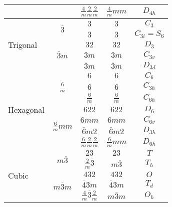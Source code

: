 \documentclass[12pt]{article}
\begin{document}
\begin{table}[h]
\begin{tabular}{lcccc}
                               &                                 & $\displaystyle \frac{4}{m}\frac{2}{m}\frac{2}{m}$ & $\displaystyle \frac{4}{m}mm$ & $D_{4h}$ \\ [1.5ex]
    \hline
    \multirow{5}{*}{Trigonal } & \multirow{2}{*}{$\overline{3}$} & $3$ & $3$ & $C_3$\\
                               &                                 & $\overline{3}$ & $\overline{3}$ & $C_{3i} = S_6$ \\
                               \cline{2-5}
							  & \multirow{3}{*}{$\overline{3}m$} & $32$ & $32$ & $D_3$\\
                               &                                 & $3m$ & $3m$ & $C_{3v}$ \\
                               &                                 & $\overline{3}m$ & $\overline{3}m$ & $D_{3d}$ \\
    \hline
    \multirow{7}{*}{Hexagonal} & \multirow{3}{*}{$\displaystyle \frac{6}{m}$} & $6$ & $6$ & $C_6$\\
                               &                                 & $\overline{6}$ & $\overline{6}$ & $C_{3h}$ \\
                               &                                 & $\displaystyle \frac{6}{m}$ & $\displaystyle \frac{6}{m}$ & $C_{6h}$ \\[1.5ex]
                               \cline{2-5}
							  & \multirow{4}{*}{$\displaystyle \frac{6}{m}mm$} & $622$ & $622$ & $D_6$\\
                               &                                 & $6mm$ & $6mm$ & $C_{6v}$ \\
                               &                                 & $\overline{6}m2$ & $\overline{6}m2$ & $D_{3h}$ \\
                               &                                 & $\displaystyle \frac{6}{m}\frac{2}{m}\frac{2}{m}$ & $\displaystyle \frac{6}{m}mm$ & $D_{6h}$ \\  [1.5ex]
    \hline
    \multirow{5}{*}{Cubic}    & \multirow{2}{*}{$m\overline{3}$} & $23$ & $23$ & $T$\\
                               &                                 & $\displaystyle \frac{2}{m}\overline{3}$ & $m\overline{3}$ & $T_h$ \\
                               \cline{2-5}
							  & \multirow{3}{*}{$m\overline{3}m$} & $432$ & $432$ & $O$\\
                               &                                 & $\overline{4}3m$ & $\overline{4}3m$ & $T_d$ \\
                               &                                 & $\displaystyle \frac{4}{m}\overline{3}\frac{2}{m}$ & $m\overline{3}m$ & $O_h$ \\ [1.5ex]
    \hline
  \end{tabular}
\end{table}
\end{document}
